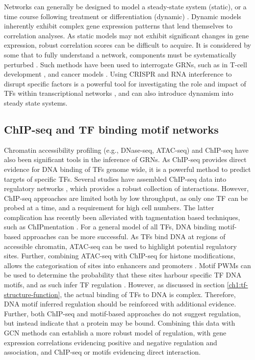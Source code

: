 Networks can generally be designed to model a steady-state system (static), or a time course following treatment or differentiation (dynamic) \citep{hecker_gene_2009}. Dynamic models inherently exhibit complex gene expression patterns that lend themselves to correlation analyses. As static models may not exhibit significant changes in gene expression, robust correlation scores can be difficult to acquire. It is considered by some that to fully understand a network, components must be systematically perturbed \citep{hecker_gene_2009, tegner_perturbations_2007, ideker_discovery_2000}. Such methods have been used to interrogate GRNs, such as in T-cell development \citep{zhou_single-cell_2022}, and cancer models \citep{morgan_perturbation-based_2020}. Using CRISPR and RNA interference to disrupt specific factors is a powerful tool for investigating the role and impact of TFs within transcriptional networks \citep{tegner_perturbations_2007, ideker_discovery_2000}, and can also introduce dynamism into steady state systems.

\subsection{ChIP-seq and TF binding motif networks}

Chromatin accessibility profiling (e.g., DNase-seq, ATAC-seq) and ChIP-seq have also been significant tools in the inference of GRNs. As ChIP-seq provides direct evidence for DNA binding of TFs genome wide, it is a powerful method to predict targets of specific TFs. Several studies have assembled ChIP-seq data into regulatory networks \citep{wade_mapping_2015, schutte_experimentally_2016}, which provides a robust collection of interactions. However, ChIP-seq approaches are limited both by low throughput, as only one TF can be probed at a time, and a requirement for high cell numbers. The latter complication has recently been alleviated with tagmentation based techniques, such as ChIPmentation \citep{gustafsson_high-throughput_2019, crump_paf1_2022}. For a general model of all TFs, DNA binding motif-based approaches can be more successful. As TFs bind DNA at regions of accessible chromatin, ATAC-seq can be used to highlight potential regulatory sites. Further, combining ATAC-seq with ChIP-seq for histone modifications, allows the categorisation of sites into enhancers and promoters \citep{heintzman_histone_2009, heintzman_distinct_2007, creyghton_histone_2010, barski_high-resolution_2007}. Motif PWMs can be used to determine the probability that these sites harbour specific TF DNA motifs, and as such infer TF regulation \citep{stormo_dna_2000}. However, as discussed in section \ref{ch1:tf-structure-function}, the actual binding of TFs to DNA is complex. Therefore, DNA motif inferred regulation should be reinforced with additional evidence. Further, both ChIP-seq and motif-based approaches do not suggest regulation, but instead indicate that a protein may be bound. Combining this data with GCN methods can establish a more robust model of regulation, with gene expression correlations evidencing positive and negative regulation and association, and ChIP-seq or motifs evidencing direct interaction.

